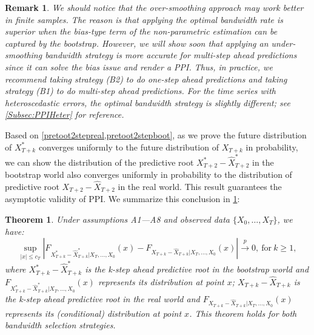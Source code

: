 \documentclass[a4paper]{article}
\newtheorem{Theorem}{Theorem}[section]
\newtheorem*{Remarknn}{Remark}
\begin{document}
\begin{Remarknn}\label{Remark:underopbandwidthdiss}
    We should notice that the over-smoothing approach may work better in finite samples. The reason is that applying the optimal bandwidth rate is superior when the bias-type term of the non-parametric estimation can be captured by the bootstrap. However, we will show soon that applying an under-smoothing bandwidth strategy is more accurate for multi-step ahead predictions since it can solve the bias issue and render a PPI. Thus, in practice, we recommend taking strategy (B2) to do one-step ahead predictions and taking strategy (B1) to do multi-step ahead predictions. For the time series with heteroscedastic errors, the optimal bandwidth strategy is slightly different; see \cref{Subsec:PPIHeter} for reference. 
\end{Remarknn}


Based on \cref{pretoot2stepreal,pretoot2stepboot}, as we prove the future distribution of $X_{T+k}^*$ converges uniformly to the future distribution of $X_{T+k}$ in probability, we can show the distribution of the predictive root $ X^*_{T+2} - \widehat{X}^*_{T+2}$ in the bootstrap world also converges uniformly in probability to the distribution of predictive root $X_{T+2} - \widehat{X}_{T+2}$ in the real world. This result guarantees the asymptotic validity of PPI. We summarize this conclusion in \cref{Theorem:PPI_part1}:

\begin{Theorem}\label{Theorem:PPI_part1}
    Under assumptions A1---A8 and observed data $\{X_0,\ldots,X_T\}$, we have:
\begin{equation}\label{claim2}
    \sup_{|x|\leq c_{T}}\left| F_{X^*_{T+k}- \widehat{X}^*_{T+k}|X_T,\ldots,X_0}(x) -  F_{X_{T+k} - \widehat{X}_{T+k}|X_T,\ldots,X_0}(x)\right| \overset{p}{\to} 0,~\text{for}~k \geq 1,\end{equation}
where $X_{T+k}^*-\widehat{X}^*_{T+k}$ is the k-step ahead predictive root in the bootstrap world and $F_{X^*_{T+k}- \widehat{X}^*_{T+k}|X_T,\ldots,X_0}(x)$ represents its distribution at point $x$; $X_{T+k} - \widehat{X}_{T+k}$ is the k-step ahead predictive root in the real world and $F_{X_{T+k} - \widehat{X}_{T+k}|X_T,\ldots,X_0}(x)$ represents its (conditional) distribution at point $x$. This theorem holds for both bandwidth selection strategies. 
\end{Theorem}
\end{document}
